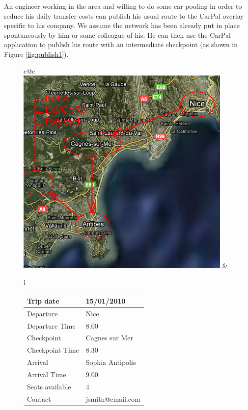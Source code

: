 An engineer working in the area and willing to do some car pooling in
order to reduce his daily transfer costs can publish his usual route
to the CarPal overlay specific to his company. We assume the network
has been already put in place spontaneously by him or some colleague
of his.  He can then use the CarPal application to publish his route
with an intermediate checkpoint (as shown in Figure
\ref{fig:publish1}).
%
\begin{figure}
  \begin{center}
    \begin{tabular}{c@{\hspace{2mm}}c}
      \includegraphics[scale=0.38]{fig/screenshot/geolock2}
      &
      \begin{tabular}[b]{l}
        \begin{tabular}{|l|l|} \hline 
          Trip date & 15/01/2010 \\ \hline 
          Departure & Nice \\ \hline 
          Departure Time & 8.00 \\ \hline
          Checkpoint & Cagnes sur Mer \\ \hline 
          Checkpoint Time & 8.30 \\ \hline
          Arrival & Sophia Antipolis \\ \hline 
          Arrival Time & 9.00 \\ \hline
          Seats available & 4 \\ \hline 
          Contact & jsmith@email.com \\ \hline
        \end{tabular}

\end{tabular}
\end{tabular}
\end{center}
\end{figure}
